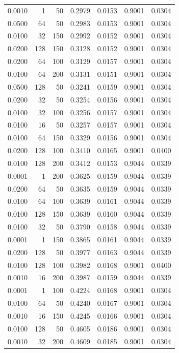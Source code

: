 \begin{tabular}{rrrrrrr}
0.0010 & 1 & 50 & 0.2979 & 0.0153 & 0.9001 & 0.0304 \\
0.0500 & 64 & 50 & 0.2983 & 0.0153 & 0.9001 & 0.0304 \\
0.0100 & 32 & 150 & 0.2992 & 0.0152 & 0.9001 & 0.0304 \\
0.0200 & 128 & 150 & 0.3128 & 0.0152 & 0.9001 & 0.0304 \\
0.0200 & 64 & 100 & 0.3129 & 0.0157 & 0.9001 & 0.0304 \\
0.0100 & 64 & 200 & 0.3131 & 0.0151 & 0.9001 & 0.0304 \\
0.0500 & 128 & 50 & 0.3241 & 0.0159 & 0.9001 & 0.0304 \\
0.0200 & 32 & 50 & 0.3254 & 0.0156 & 0.9001 & 0.0304 \\
0.0100 & 32 & 100 & 0.3256 & 0.0157 & 0.9001 & 0.0304 \\
0.0100 & 16 & 50 & 0.3257 & 0.0157 & 0.9001 & 0.0304 \\
0.0100 & 64 & 150 & 0.3329 & 0.0156 & 0.9001 & 0.0304 \\
0.0200 & 128 & 100 & 0.3410 & 0.0165 & 0.9001 & 0.0400 \\
0.0100 & 128 & 200 & 0.3412 & 0.0153 & 0.9044 & 0.0339 \\
0.0001 & 1 & 200 & 0.3625 & 0.0159 & 0.9044 & 0.0339 \\
0.0200 & 64 & 50 & 0.3635 & 0.0159 & 0.9044 & 0.0339 \\
0.0100 & 64 & 100 & 0.3639 & 0.0161 & 0.9044 & 0.0339 \\
0.0100 & 128 & 150 & 0.3639 & 0.0160 & 0.9044 & 0.0339 \\
0.0100 & 32 & 50 & 0.3790 & 0.0158 & 0.9044 & 0.0339 \\
0.0001 & 1 & 150 & 0.3865 & 0.0161 & 0.9044 & 0.0339 \\
0.0200 & 128 & 50 & 0.3977 & 0.0163 & 0.9044 & 0.0339 \\
0.0100 & 128 & 100 & 0.3982 & 0.0168 & 0.9001 & 0.0400 \\
0.0010 & 16 & 200 & 0.3987 & 0.0159 & 0.9044 & 0.0339 \\
0.0001 & 1 & 100 & 0.4224 & 0.0168 & 0.9001 & 0.0304 \\
0.0100 & 64 & 50 & 0.4240 & 0.0167 & 0.9001 & 0.0304 \\
0.0010 & 16 & 150 & 0.4245 & 0.0166 & 0.9001 & 0.0304 \\
0.0100 & 128 & 50 & 0.4605 & 0.0186 & 0.9001 & 0.0304 \\
0.0010 & 32 & 200 & 0.4609 & 0.0185 & 0.9001 & 0.0304 \\

\end{tabular}
